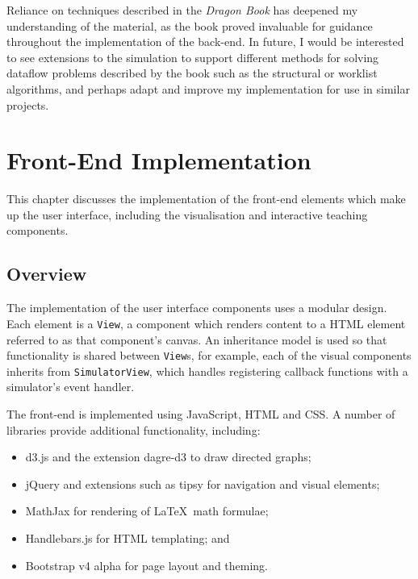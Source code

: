 \documentclass[bsc,twoside,singlespacing,parskip,logo,notimes,normalheadings]{infthesis}
\begin{document}
        Reliance on techniques described in the {\em Dragon
          Book}\cite{dragonbook} has deepened my understanding of the
        material, as the book proved invaluable for guidance
        throughout the implementation of the back-end. In future, I
        would be interested to see extensions to the simulation to
        support different methods for solving \gls{dataflow} problems
        described by the book such as the structural or worklist
        algorithms, and perhaps adapt and improve my implementation
        for use in similar projects.

        

        

\chapter{Front-End Implementation}\label{chap:impl-frontend}
This chapter discusses the implementation of the front-end elements
which make up the user interface, including the visualisation and
interactive teaching components.

    \section{Overview}
    The implementation of the user interface components uses a modular
    design. Each element is a {\tt View}, a component which renders
    content to a HTML element referred to as that component's
    canvas. An inheritance model is used so that functionality is
    shared between {\tt View}s, for example, each of the visual
    components inherits from {\tt SimulatorView}, which handles
    registering callback functions with a simulator's event handler.

    The front-end is implemented using JavaScript, HTML and CSS. A
    number of libraries provide additional functionality, including:

    \begin{itemize}
    \item d3.js and the extension dagre-d3 to draw directed graphs;
    \item jQuery and extensions such as tipsy for navigation and
      visual elements;
    \item MathJax for rendering of \LaTeX\ math formulae;
    \item Handlebars.js for HTML templating; and
    \item Bootstrap v4 alpha for page layout and theming.
    \end{itemize}
\end{document}
